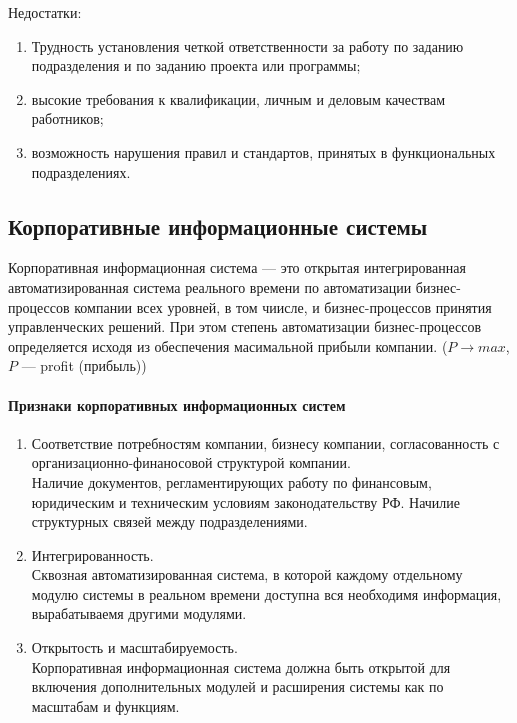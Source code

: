 Недостатки:
\begin{enumerate}
  \item Трудность установления четкой ответственности за работу по заданию
    подразделения и по заданию проекта или программы;
  \item высокие требования к квалификации, личным и деловым качествам
    работников;
  \item возможность нарушения правил и стандартов, принятых в функциональных
    подразделениях.
\end{enumerate}

\subsection{Корпоративные информационные системы}
Корпоративная информационная система --- это открытая интегрированная
автоматизированная система реального времени по автоматизации бизнес-процессов
компании всех уровней, в том чиисле, и бизнес-процессов принятия управленческих
решений. При этом степень автоматизации бизнес-процессов определяется исходя из
обеспечения масимальной прибыли компании. ($P \to max$, $P$ --- profit (прибыль))

\paragraph{Признаки корпоративных информационных систем}\mbox{}\par
\begin{enumerate}
  \item Соответствие потребностям компании, бизнесу компании, согласованность с
    организационно-финаносовой структурой компании.\\
    Наличие документов, регламентирующих работу по финансовым, юридическим и
    техническим условиям законодательству РФ. Начилие структурных связей между
    подразделениями.
  \item Интегрированность.\\
    Сквозная автоматизированная система, в которой каждому отдельному модулю
    системы в реальном времени доступна вся необходимя информация, вырабатываемя
    другими модулями.
  \item Открытость и масштабируемость.\\
    Корпоративная информационная система должна быть открытой для включения
    дополнительных модулей и расширения системы как по масштабам и функциям.
\end{enumerate}

